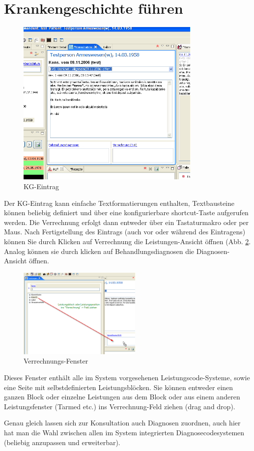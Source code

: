 \section{Krankengeschichte führen}
\begin{figure}
    \begin{center}
	   \includegraphics[width=0.8\textwidth]{images/einf6}
    	\caption{KG-Eintrag}
	   \label{fig:KG}
    \end{center}
\end{figure}
Der KG-Eintrag kann einfache Textformatierungen enthalten, Textbausteine können
beliebig definiert und über eine konfigurierbare shortcut-Taste aufgerufen werden. Die Verrechnung erfolgt dann entweder über ein Tastaturmakro oder per Maus.
Nach Fertigstellung des Eintrags (auch vor oder während des Eintragens) können
Sie durch Klicken auf \glqq Verrechnung\grqq{} die Leistungen-Ansicht öffnen
(Abb. \ref{fig:Verrechnung}. Analog können sie durch klicken auf
\glqq Behandlungsdiagnosen\grqq{} die Diagnosen-Ansicht öffnen.\bigskip
\begin{figure}[ht]
	\includegraphics[width=6cm]{images/einf7}
	\caption{Verrechnungs-Fenster}
	\label{fig:Verrechnung}
\end{figure}
Dieses Fenster enthält alle im System vorgesehenen Leistungscode-Systeme, sowie eine Seite mit selbstdefinierten Leistungsblöcken.
Sie können entweder einen ganzen Block oder einzelne Leistungen aus dem Block oder aus einem anderen Leistungsfenster (Tarmed etc.) ins \glqq Verrechnung\grqq{}-Feld ziehen (drag and drop).

Genau gleich lassen sich zur Konsultation auch Diagnosen zuordnen, auch hier hat man die Wahl zwischen allen im System integrierten Diagnosecodesystemen (beliebig anzupassen und erweiterbar).

